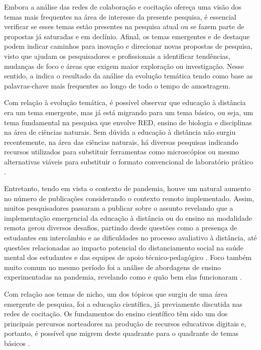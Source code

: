 \documentclass[portuguese]{textolivre}
\begin{document}
Embora a análise das redes de colaboração e cocitação ofereça uma visão dos temas mais frequentes na área de interesse da presente pesquisa, é essencial verificar se esses temas estão presentes na pesquisa atual ou se fazem parte de propostas já saturadas e em declínio. Afinal, os temas emergentes e de destaque podem indicar caminhos para inovação e direcionar novas propostas de pesquisa, visto que ajudam os pesquisadores e profissionais a identificar tendências, mudanças de foco e áreas que exigem maior exploração ou investigação. Nesse sentido, a  indica o resultado da análise da evolução temática tendo como base as palavras-chave mais frequentes ao longo de todo o tempo de amostragem.

Com relação à evolução temática, é possível observar que educação à distância era um tema emergente, mas já está migrando para um tema básico, ou seja, um tema fundamental na pesquisa que envolve RED, ensino de biologia e disciplinas na área de ciências naturais. Sem dúvida a educação à distância não surgiu recentemente, na área das ciências naturais, há diversas pesquisas indicando recursos utilizados para substituir ferramentas como microscópios ou mesmo alternativas viáveis para substituir o formato convencional de laboratório prático \cite{winkelmann_development_2017}.

Entretanto, tendo em vista o contexto de pandemia, houve um natural aumento no número de publicações considerando o contexto remoto implementado. Assim, muitos pesquisadores passaram a publicar sobre o assunto revelando que a implementação emergencial da educação à distância ou do ensino na modalidade remota gerou diversos desafios, partindo desde questões como a presença de estudantes em intercâmbio e as dificuldades no processo avaliativo à distância, até questões relacionadas ao impacto potencial do distanciamento social na saúde mental dos estudantes e das equipes de apoio técnico-pedagógico \cite{sahu_closure_2020}. Foco também muito comum no mesmo período foi a análise de abordagens de ensino experimentadas na pandemia, revelando como e quão bem elas funcionaram \cite{holme_introduction_2020}.

Com relação aos temas de nicho, um dos tópicos que surgiu de uma área emergente de pesquisa, foi a educação científica, já previamente discutida nas redes de cocitação. Os fundamentos do ensino científico têm sido um dos principais percursos norteadores na produção de recursos educativos digitais e, portanto, é possível que migrem deste quadrante para o quadrante de temas básicos \cite{handelsman_scientific_2004,couch_scientific_2015}.
\end{document}
